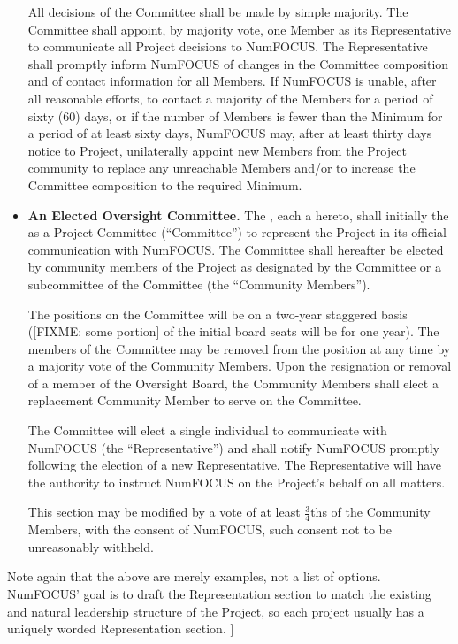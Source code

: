 \begin{itemize}
All decisions of the Committee shall be made by simple majority. The Committee
shall appoint, by majority vote, one Member as its Representative to
communicate all Project decisions to NumFOCUS. The Representative shall
promptly inform NumFOCUS of changes in the Committee composition and of contact
information for all Members. If NumFOCUS is unable, after all reasonable
efforts, to contact a majority of the Members for a period of sixty (60) days,
or if the number of Members is fewer than the Minimum for a period of at least
sixty days, NumFOCUS may, after at least thirty days notice to Project,
unilaterally appoint new Members from the Project community to replace any
unreachable Members and/or to increase the Committee composition to the
required Minimum.

\item \textbf{An Elected Oversight Committee.} The \signatories{}, each a
  hereto, shall initially  the \leadershipbody{} as a
  Project Committee (``Committee'') to represent the Project in its official
  communication with NumFOCUS.  The Committee shall hereafter be elected by
  community members of the Project as designated by the Committee or a
  subcommittee of the Committee (the ``Community Members'').

The positions on the Committee will be on a two-year staggered basis ([FIXME:
  some portion] of the initial board seats will be for one year).  The members
of the Committee may be removed from the position at any time by a majority
vote of the Community Members.  Upon the resignation or removal of a member of
the Oversight Board, the Community Members shall elect a replacement Community
Member to serve on the Committee.

The Committee will elect a single individual to communicate with NumFOCUS (the
``Representative'') and shall notify NumFOCUS promptly following the election
of a new Representative.  The Representative will have the authority to
instruct NumFOCUS on the Project's behalf on all matters.

This section may be modified by a vote of at least $\frac{3}{4}$ths of the
Community Members, with the consent of NumFOCUS, such consent not to be
unreasonably withheld.


\end{itemize}

Note again that the above are merely examples, not a list of options.
NumFOCUS' goal is to draft the Representation section to match the existing and
natural leadership structure of the Project, so each project usually has a
uniquely worded Representation section.  ]
